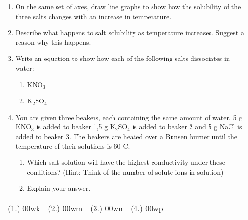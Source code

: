 {\begin{enumerate}
\item{On the same set of axes, draw line graphs to show how the solubility of the three salts changes with an increase in temperature.}
\item{Describe what happens to salt solubility as temperature increases. Suggest a reason why this happens.}
\item{Write an equation to show how each of the following salts dissociates in water:}
\begin{enumerate}
\item{KNO$_{3}$}
\item{K$_{2}$SO$_{4}$}
\end{enumerate}
\item{You are given three beakers, each containing the same amount of water. 5 g KNO$_{3}$ is added to beaker 1,5 g K$_{2}$SO$_{4}$ is added to beaker 2 and 5 g NaCl is added to beaker 3. The beakers are heated over a Bunsen burner until the temperature of their solutions is 60$^{\circ}$C.}
\begin{enumerate}
\item{Which salt solution will have the highest conductivity under these conditions? (Hint: Think of the number of solute ions in solution) }
\item{Explain your answer.}
\end{enumerate}
\end{enumerate}
\practiceinfo

\begin{tabular}[h]{cccccc}
(1.) 00wk & (2.) 00wm & (3.) 00wn & (4.) 00wp & 
 \end{tabular}
}

